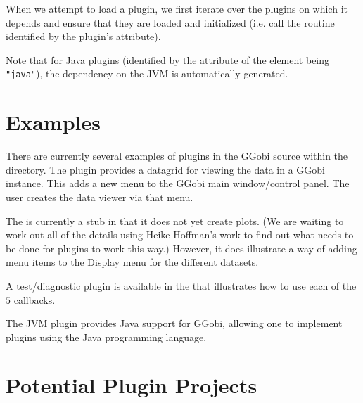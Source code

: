 \documentclass{article}
\begin{document}
When we attempt to load a plugin, we first iterate over the plugins on
which it depends and ensure that they are loaded and initialized (i.e.
call the routine identified by the plugin's 
attribute).

Note that for Java plugins (identified by the 
attribute of the  element being \texttt{"java"}), the
dependency on the JVM is automatically generated.


\section{Examples}

There are currently several examples of plugins in the GGobi source
within the  directory.  The  plugin
provides a datagrid for viewing the data in a GGobi instance.  This
adds a new menu to the GGobi main window/control panel.  The user
creates the data viewer via that menu.

The  is currently a stub in that it does not yet
create plots. (We are waiting to work out all of the details using
Heike Hoffman's work to find out what needs to be done for plugins to
work this way.) However, it does illustrate a way of adding menu items
to the Display menu for the different datasets.

A test/diagnostic plugin is available in the 
that illustrates how to use each of the $5$ callbacks.

The JVM plugin provides Java support for GGobi, allowing one to
implement plugins using the Java programming language.

\section{Potential Plugin Projects}
\end{document}
